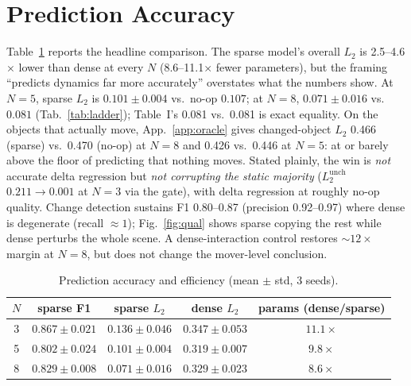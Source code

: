 \documentclass[conference]{IEEEtran}
\begin{document}
\section{Prediction Accuracy}\label{sec:prediction}
Table~\ref{tab:headline} reports the headline comparison. The sparse model's overall
$L_2$ is 2.5--4.6$\times$ lower than dense at every $N$ (8.6--11.1$\times$ fewer
parameters), but the framing ``predicts dynamics far more accurately'' overstates what
the numbers show. At $N{=}5$, sparse $L_2$ is $0.101\pm0.004$ vs.\ no-op $0.107$; at
$N{=}8$, $0.071\pm0.016$ vs.\ $0.081$ (Tab.~\ref{tab:ladder}); Table~I's 0.081 vs.\
0.081 is exact equality. On the objects that actually move, App.~\ref{app:oracle}
gives changed-object $L_2$ 0.466 (sparse) vs.\ 0.470 (no-op) at $N{=}8$ and 0.426 vs.\
0.446 at $N{=}5$: at or barely above the floor of predicting that nothing moves.
Stated plainly, the win is \emph{not} accurate delta regression but \emph{not corrupting
the static majority} ($L_2^{\text{unch}}$ $0.211\to0.001$ at $N{=}3$ via the gate), with
delta regression at roughly no-op quality. Change detection sustains F1 0.80--0.87 (precision 0.92--0.97) where dense
is degenerate (recall $\approx1$); Fig.~\ref{fig:qual} shows sparse copying the rest
while dense perturbs the whole scene. A dense-interaction control restores $\sim12\times$
margin at $N{=}8$, but does not change the mover-level conclusion.

\begin{table}[t]
\caption{Prediction accuracy and efficiency (mean $\pm$ std, 3 seeds).}
\label{tab:headline}
\centering
\setlength{\tabcolsep}{3pt}
\begin{tabular}{@{}ccccc@{}}
\toprule
$N$ & sparse F1 & sparse $L_2$ & dense $L_2$ & params (dense/sparse) \\
\midrule
3 & $0.867 \pm 0.021$ & $0.136 \pm 0.046$ & $0.347 \pm 0.053$ & $11.1\times$ \\
5 & $0.802 \pm 0.024$ & $0.101 \pm 0.004$ & $0.319 \pm 0.007$ & $9.8\times$ \\
8 & $0.829 \pm 0.008$ & $0.071 \pm 0.016$ & $0.329 \pm 0.023$ & $8.6\times$ \\
\bottomrule
\end{tabular}
\end{table}

\end{document}
